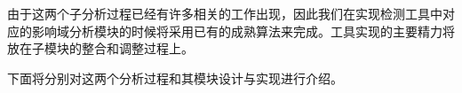 由于这两个子分析过程已经有许多相关的工作出现，因此我们在实现检测工具中对应的影响域分析模块的时候将采用已有的成熟算法来完成。工具实现的主要精力将放在子模块的整合和调整过程上。

下面将分别对这两个分析过程和其模块设计与实现进行介绍。


%
%
%
%
%
%
%
%
%
%
